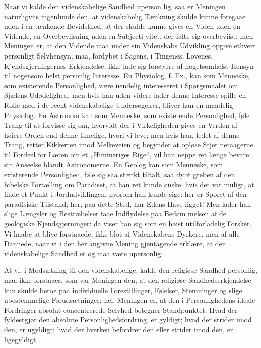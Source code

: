 \documentclass[12pt]{book}
\newcommand{\opage}[1]{\marginnote{\footnotesize\textit{[#1]}}}
\begin{document}
Naar vi kalde den videnskabelige Sandhed uperson\-%
lig, saa er Meningen naturligviis ingenlunde den, at
videnskabelig Tænkning skulde kunne foregaae uden i en
tænkende Bevidsthed, at der skulde kunne gives en Viden
uden en Vidende, en Overbeviisning uden en Subjecti\-%
vitet, der følte sig overbeviist; men Meningen er, at den
Vidende maa under sin Videnskabs Udvikling opgive
ethvert personligt Selvhensyn, maa, fordybet i Sagens, i
Tingenes, Lovenes, Kjendsgjerningernes Erkjendelse, ikke
lade sig forstyrre af nogetsomhelst Hensyn til nogensom\-%
helst personlig Interesse. En Physiolog, f. Ex., kan som
Menneske, som existerende Personlighed, være uendelig
interesseret i Spørgsmaalet om Sjælens Udødelighed; men
hvis han uden videre lader denne Interesse spille en
\opage{196}\setcounter{footnote}{0}%
Rolle med i de reent videnskabelige Undersøgelser, bliver
han en maadelig Physiolog. En Astronom kan som
Menneske, som existerende Personlighed, føle Trang til
at forvisse sig om, hvorvidt der i Virkeligheden gives en
Verden af høiere Orden end denne timelige, hvori
vi leve; men hvis han, ledet af denne Trang, retter
Kikkerten imod Melkeveien og begynder at opløse Stjer\-%
netaagerne til Fordeel for Læren om et „Himmeriges
Rige“, vil han neppe ret længe bevare sin Anseelse blandt
Astronomerne. En Geolog kan som Menneske, som
existerende Personlighed, føle sig saa stærkt tiltalt, saa
dybt greben af den bibelske Fortælling om Paradiset, at
han ret kunde ønske, hvis det var muligt, at finde et
Punkt i Jordudviklingen, hvorom han kunde sige: her
er Sporet af den paradisiske Tilstand; her, paa dette
Sted, har Edens Have ligget! Men lader han slige
Længsler og Bestræbelser faae Indflydelse paa Bedøm\-%
melsen af de geologiske Kjendsgjerninger: da viser
han sig som en høist utilforladelig Forsker. Vi haabe
at blive forstaaede, ikke blot af Videnskabens Dyrkere,
men af alle Dannede, naar vi i den her angivne Mening
gjentagende erklære, at den videnskabelige Sandhed er
og maa være upersonlig.

At vi, i Modsætning til den videnskabelige, kalde
den religiøse Sandhed personlig, maa ikke forstaaes, som
var Meningen den, at den religiøse Sandhedserkjendelse
kun skulde beroe paa individuelle Forestillinger, Følelser,
Stemninger og slige ubestemmelige Forudsætninger; nei,
Meningen er, at den i Personlighedens ideale Fordringer
absolut concentrerede Selvhed betegner Standpunktet.
Hvad der fyldestgjør den absolute Personlighedsfordring,
er gyldigt; hvad der strider imod den, er ugyldigt; hvad
der hverken befordrer den eller strider imod den, er
ligegyldigt.
\end{document}
